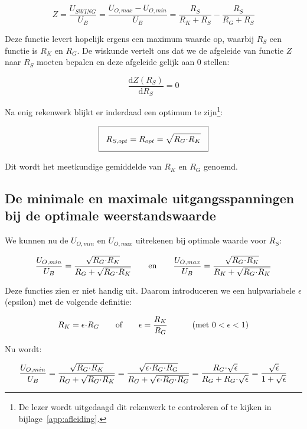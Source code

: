 \documentclass[12pt,a4paper,final,twoside,fleqn]{article}
\newcommand{\ropt}{R_{opt}}
\let\oldcdot\cdot
\renewcommand{\cdot}{\kern-.10em\oldcdot\kern-.10em}
\begin{document}
\begin{equation}
Z = \dfrac{U_{SWING}}{U_B}=\dfrac{U_{O,max} - U_{O,min}}{U_B} = \dfrac{R_S}{R_K+R_S}-\dfrac{R_S}{R_G+R_S}
\end{equation}

Deze functie levert hopelijk ergens een maximum waarde op, waarbij $R_S$ een
functie is $R_K$ en $R_G$. De wiskunde vertelt ons dat we de afgeleide van
functie $Z$ naar $R_S$ moeten bepalen en deze afgeleide gelijk aan $0$ stellen:

\begin{equation}
\dfrac{\text{d} Z(R_S)}{\text{d} R_S} = 0
\end{equation}

Na enig rekenwerk  blijkt er inderdaad een optimum te zijn\footnote{De lezer wordt
uitgedaagd dit rekenwerk te controleren of te kijken in bijlage~\ref{app:afleiding}.}:

\begin{equation}
\setlength\fboxsep{2ex}
\boxed{R_{S,opt} = \ropt = \sqrt{R_G\cdot R_K}}
\end{equation}

Dit wordt het meetkundige gemiddelde van $R_K$ en $R_G$ genoemd.

\subsection{De minimale en maximale uitgangsspanningen bij de optimale weerstandswaarde}

 We kunnen
nu de $U_{O,min}$ en $U_{O,max}$ uitrekenen bij optimale waarde voor $R_S$:

\begin{equation}
\dfrac{U_{O,min}}{U_B} = \dfrac{\sqrt{R_G\cdot R_K}}{R_G + \sqrt{R_G\cdot R_K}}
\qquad\text{en}\qquad
\dfrac{U_{O,max}}{U_B} = \dfrac{\sqrt{R_G\cdot R_K}}{R_K + \sqrt{R_G\cdot R_K}}
\end{equation}

Deze functies zien er niet handig uit. Daarom introduceren we een hulpvariabele
$\epsilon$ (epsilon) met de volgende definitie:

\begin{equation}
R_K = \epsilon\cdot R_G \qquad\text{of}\qquad \epsilon=\dfrac{R_K}{R_G}
\qquad\quad\text{(met } 0<\epsilon <1)
\end{equation}

Nu wordt:

\begin{equation}
\label{equ:uominub}
\dfrac{U_{O,min}}{U_B} = \dfrac{\sqrt{R_G\cdot R_K}}{R_G + \sqrt{R_G\cdot R_K}}
                       = \dfrac{\sqrt{\epsilon\cdot R_G\cdot R_G}}{R_G+\sqrt{\epsilon\cdot R_G\cdot R_G}}
                       = \dfrac{R_G\cdot\sqrt{\epsilon}}{R_G+R_G\cdot\sqrt{\epsilon}}
                       = \dfrac{\sqrt{\epsilon}}{1+\sqrt{\epsilon}}
\end{equation}
\end{document}
